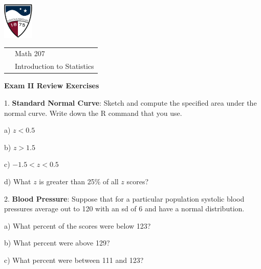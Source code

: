 \documentclass[10pt]{article}
\begin{document}
\pagestyle{empty}


\href{http://www.su.edu}{\includegraphics[height=1.75cm]{sulogo.eps}}
\vspace{-1.69cm}

\hfill {\small
\begin{tabular}{cl}
& Math 207\\
& Introduction to Statistics\\
\end{tabular}
}
\setlength{\baselineskip}{1.05\baselineskip}
\bigskip

\begin{center}
\textbf{\large  Exam II Review Exercises}
\end{center}
\medskip

1. \textbf{Standard Normal Curve}:  Sketch and compute the specified area under the normal curve. 
Write down the R command that you use.

\hspace{10pt} a) $z < 0.5$
\vspace{.4in}

\hspace{10pt} b) $z > 1.5$
\vspace{.5in}

\hspace{10pt} c) $-1.5< z < 0.5$
\vspace{.5in}

\hspace{10pt} d) What $z$ is greater than 25\% of all $z$ scores?
\vspace{.5in}

2. \textbf{Blood Pressure}:  Suppose that for a particular population
systolic blood pressures average out to 120 with an sd of 6 and have
a normal distribution.

\hspace{10pt} a) What percent of the scores were below 123?
\vspace{1.1in}

\hspace{10pt} b) What percent were above 129?
\vspace{1.1in}

\hspace{10pt} c) What percent were between 111 and 123?
\vspace{1.1in}
\end{document}
